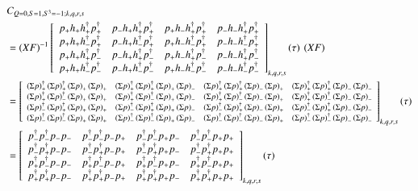 \begin{equation}
  \begin{aligned}
    &C_{Q=0,S=1,S^3=-1;k,q,r,s} \\
    &=\left(XF\right)^{-1} \left[ 
    {\begin{array}{cccc}
      \cor{+}{+}{+}{+} & \cor{+}{+}{+}{-} & \cor{+}{+}{-}{+} & \cor{+}{+}{-}{-} \\
      \cor{+}{-}{+}{+} & \cor{+}{-}{+}{-} & \cor{+}{-}{-}{+} & \cor{+}{-}{-}{-} \\
      \cor{-}{+}{+}{+} & \cor{-}{+}{+}{-} & \cor{-}{+}{-}{+} & \cor{-}{+}{-}{-} \\
      \cor{-}{-}{+}{+} & \cor{-}{-}{+}{-} & \cor{-}{-}{-}{+} & \cor{-}{-}{-}{-} \\
    \end{array}}
    \right]_{k,q,r,s} (\tau)\:\left(XF\right) \\
    &= \left[\resizebox{\textwidth}{!}{%
    $
    {\begin{array}{cccc}
      \dscor{+}{+}{+}{+} & \dscor{+}{+}{+}{-} & \dscor{+}{+}{-}{+} & \dscor{+}{+}{-}{-} \\
      \dscor{+}{-}{+}{+} & \dscor{+}{-}{+}{-} & \dscor{+}{-}{-}{+} & \dscor{+}{-}{-}{-} \\
      \dscor{-}{+}{+}{+} & \dscor{-}{+}{+}{-} & \dscor{-}{+}{-}{+} & \dscor{-}{+}{-}{-} \\
      \dscor{-}{-}{+}{+} & \dscor{-}{-}{+}{-} & \dscor{-}{-}{-}{+} & \dscor{-}{-}{-}{-} \\
    \end{array}}$}
    \right]_{k,q,r,s} (\tau) \\
    &= \left[ 
    {\begin{array}{cccc}
      \dcor{-}{-}{-}{-} & \dcor{-}{-}{-}{+} & \dcor{-}{-}{+}{-} & \dcor{-}{-}{+}{+} \\
      \dcor{-}{+}{-}{-} & \dcor{-}{+}{-}{+} & \dcor{-}{+}{+}{-} & \dcor{-}{+}{+}{+} \\
      \dcor{+}{-}{-}{-} & \dcor{+}{-}{-}{+} & \dcor{+}{-}{+}{-} & \dcor{+}{-}{+}{+} \\
      \dcor{+}{+}{-}{-} & \dcor{+}{+}{-}{+} & \dcor{+}{+}{+}{-} & \dcor{+}{+}{+}{+} \\
    \end{array} } \right]_{k,q,r,s} (\tau) \\
  \end{aligned}
\end{equation}
  \renewcommand{\cor}[4]{p_{#4}h_{#3}h^\dagger_{#2}p^\dagger_{#1}}
